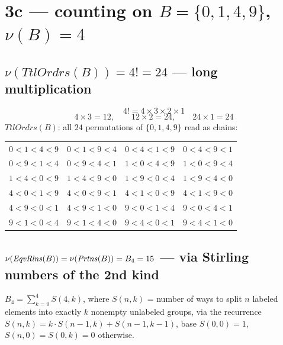 \documentclass[11pt]{article}
\newcommand{\op}[1]{\mathit{#1}}
\newcommand{\Prtns}{\op{Prtns}}
\newcommand{\seclabel}[1]{\noindent\fbox{\textbf{#1}}\par\smallskip}
\begin{document}
\clearpage
\section*{3c --- counting on $B=\{0,1,4,9\}$, $\nu(B)=4$}
\seclabel{3c}

\subsection*{$\nu(\op{TtlOrdrs}(B)) = 4! = 24$ --- long multiplication}
\[
4! = 4\times3\times2\times1
\]
\[
4\times3 = 12,\qquad 12\times2 = 24,\qquad 24\times1 = 24
\]
$\op{TtlOrdrs}(B)$: all $24$ permutations of $\{0,1,4,9\}$ read as chains:
\begin{center}
\begin{tabular}{llll}
$0{<}1{<}4{<}9$ & $0{<}1{<}9{<}4$ & $0{<}4{<}1{<}9$ & $0{<}4{<}9{<}1$\\
$0{<}9{<}1{<}4$ & $0{<}9{<}4{<}1$ & $1{<}0{<}4{<}9$ & $1{<}0{<}9{<}4$\\
$1{<}4{<}0{<}9$ & $1{<}4{<}9{<}0$ & $1{<}9{<}0{<}4$ & $1{<}9{<}4{<}0$\\
$4{<}0{<}1{<}9$ & $4{<}0{<}9{<}1$ & $4{<}1{<}0{<}9$ & $4{<}1{<}9{<}0$\\
$4{<}9{<}0{<}1$ & $4{<}9{<}1{<}0$ & $9{<}0{<}1{<}4$ & $9{<}0{<}4{<}1$\\
$9{<}1{<}0{<}4$ & $9{<}1{<}4{<}0$ & $9{<}4{<}0{<}1$ & $9{<}4{<}1{<}0$
\end{tabular}
\end{center}

\subsection*{$\nu(\EqvRlns(B))=\nu(\Prtns(B)) = B_4 = 15$ --- via Stirling numbers of the 2nd kind}
$B_4 = \sum_{k=0}^{4} S(4,k)$, where $S(n,k)$ = number of ways to split $n$ labeled elements into exactly $k$ nonempty unlabeled groups, via the recurrence $S(n,k)=k\!\cdot\! S(n-1,k)+S(n-1,k-1)$, base $S(0,0)=1$, $S(n,0)=S(0,k)=0$ otherwise.
\end{document}
